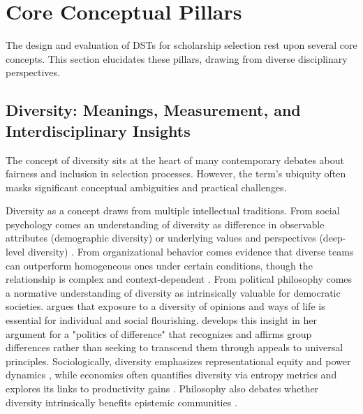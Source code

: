 \section{Core Conceptual Pillars}\label{sec:context_conceptual_pillars}

The design and evaluation of DSTs for scholarship selection rest upon several core concepts. This section elucidates these pillars, drawing from diverse disciplinary perspectives.

\subsection{Diversity: Meanings, Measurement, and Interdisciplinary Insights}\label{ssec:context_diversity}
The concept of diversity sits at the heart of many contemporary debates about fairness and inclusion in selection processes. However, the term's ubiquity often masks significant conceptual ambiguities and practical challenges.

Diversity as a concept draws from multiple intellectual traditions. From social psychology comes an understanding of diversity as difference in observable attributes (demographic diversity) or underlying values and perspectives (deep-level diversity) \cite{harrison1998time}. From organizational behavior comes evidence that diverse teams can outperform homogeneous ones under certain conditions, though the relationship is complex and context-dependent \cite{williams2013demography}. From political philosophy comes a normative understanding of diversity as intrinsically valuable for democratic societies. \textcite{mill1859liberty} argues that exposure to a diversity of opinions and ways of life is essential for individual and social flourishing. \textcite{young1990justice} develops this insight in her argument for a "politics of difference" that recognizes and affirms group differences rather than seeking to transcend them through appeals to universal principles. Sociologically, diversity emphasizes representational equity and power dynamics \cite{benjamin2019race,noble2018algorithms}, while economics often quantifies diversity via entropy metrics and explores its links to productivity gains \cite{noray2023systemic, page_diversity_2010}. Philosophy also debates whether diversity intrinsically benefits epistemic communities \cite{page_diversity_2010}.

